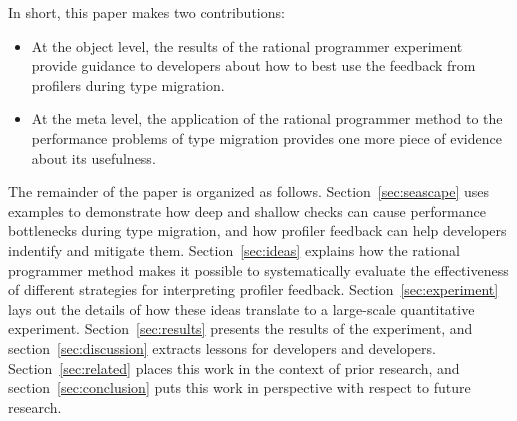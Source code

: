 In short, this paper makes two contributions:
\begin{itemize}

\item At the object level, the results of the rational programmer experiment
 provide guidance to developers about how to best use the feedback from
 profilers during type migration.

\item At the meta level, the application of the rational programmer method to
 the performance problems of type migration provides one more piece of evidence
 about its usefulness. 
    
\end{itemize}    
The remainder of the paper is organized as follows.  Section~\ref{sec:seascape}
uses examples to demonstrate how deep and shallow checks can cause performance
bottlenecks during type migration, and how profiler feedback can help developers
indentify and mitigate them.  Section~\ref{sec:ideas} explains how the rational
programmer method makes it possible to systematically evaluate the effectiveness
of different strategies for interpreting profiler
feedback. Section~\ref{sec:experiment} lays out the details of how these ideas
translate to a large-scale quantitative experiment.  Section~\ref{sec:results}
presents the results of the experiment, and section~\ref{sec:discussion}
extracts lessons for developers and developers.  Section~\ref{sec:related}
places this work in the context of prior research, and
section~\ref{sec:conclusion} puts this work in perspective with respect to
future research.
